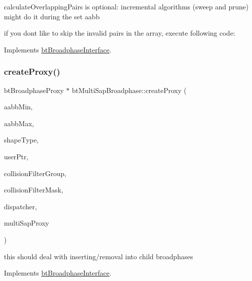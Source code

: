 calculate\+Overlapping\+Pairs is optional\+: incremental algorithms (sweep and prune) might do it during the set aabb 

if you don\textquotesingle{}t like to skip the invalid pairs in the array, execute following code\+: 

Implements \hyperlink{classbtBroadphaseInterface_a27e29cb6fd31e5fe626e7ba973e67ddb}{bt\+Broadphase\+Interface}.

\mbox{\label{classbtMultiSapBroadphase_a56e2b68f3b1c54dbc102d5f3b8004d55}} 
\subsubsection{\texorpdfstring{create\+Proxy()}{createProxy()}}
{\footnotesize\ttfamily bt\+Broadphase\+Proxy $\ast$ bt\+Multi\+Sap\+Broadphase\+::create\+Proxy (\begin{DoxyParamCaption}\item[{const bt\+Vector3 \&}]{aabb\+Min,  }\item[{const bt\+Vector3 \&}]{aabb\+Max,  }\item[{int}]{shape\+Type,  }\item[{void $\ast$}]{user\+Ptr,  }\item[{short int}]{collision\+Filter\+Group,  }\item[{short int}]{collision\+Filter\+Mask,  }\item[{\hyperlink{classbtDispatcher}{bt\+Dispatcher} $\ast$}]{dispatcher,  }\item[{void $\ast$}]{multi\+Sap\+Proxy }\end{DoxyParamCaption})\hspace{0.3cm}{\ttfamily [virtual]}}

this should deal with inserting/removal into child broadphases 

Implements \hyperlink{classbtBroadphaseInterface}{bt\+Broadphase\+Interface}.

\mbox{\label{classbtMultiSapBroadphase_a8cbeafd597e31f634863efe5186000b9}} 
